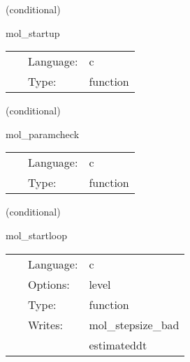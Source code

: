    (conditional) 

\hspace{5mm} mol\_startup 

\hspace{5mm}{\it startup banner } 


\hspace{5mm}

 \begin{tabular*}{160mm}{cll} 
~ & Language:  & c \\ 
~ & Type:  & function \\ 
\end{tabular*} 


\vspace{5mm}

   (conditional) 

\hspace{5mm} mol\_paramcheck 

\hspace{5mm}{\it basic parameter checking } 


\hspace{5mm}

 \begin{tabular*}{160mm}{cll} 
~ & Language:  & c \\ 
~ & Type:  & function \\ 
\end{tabular*} 


\vspace{5mm}

   (conditional) 

\hspace{5mm} mol\_startloop 

\hspace{5mm}{\it initialise the step size control } 


\hspace{5mm}

 \begin{tabular*}{160mm}{cll} 
~ & Language:  & c \\ 
~ & Options:  & level \\ 
~ & Type:  & function \\ 
~ & Writes:  & mol\_stepsize\_bad \\ 
~& ~ &estimateddt\\ 
\end{tabular*} 


\vspace{5mm}

